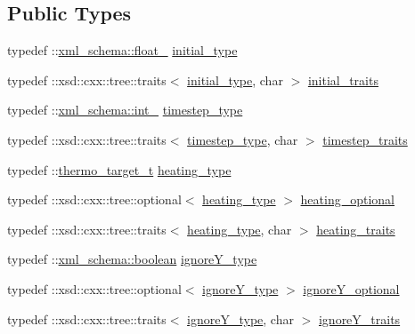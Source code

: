 \subsection*{Public Types}
\begin{DoxyCompactItemize}
\item 
typedef \+::\hyperlink{namespacexml__schema_ad7e04ab17bba0b3fdde43fb79ef6ed87}{xml\+\_\+schema\+::float\+\_\+} \hyperlink{classthermo__t_a3b889c80ce97870a6967ebee963438ed}{initial\+\_\+type}
\item 
typedef \+::xsd\+::cxx\+::tree\+::traits$<$ \hyperlink{classthermo__t_a3b889c80ce97870a6967ebee963438ed}{initial\+\_\+type}, char $>$ \hyperlink{classthermo__t_a857c3d12cdb293a7ec3ea2e2ac52812c}{initial\+\_\+traits}
\item 
typedef \+::\hyperlink{namespacexml__schema_acfa24ac68e1a188e7f44c36f7a158bf4}{xml\+\_\+schema\+::int\+\_\+} \hyperlink{classthermo__t_a6895e9b201424e2fada14df933774b0c}{timestep\+\_\+type}
\item 
typedef \+::xsd\+::cxx\+::tree\+::traits$<$ \hyperlink{classthermo__t_a6895e9b201424e2fada14df933774b0c}{timestep\+\_\+type}, char $>$ \hyperlink{classthermo__t_a22923d5493f01433df1b956905308222}{timestep\+\_\+traits}
\item 
typedef \+::\hyperlink{classthermo__target__t}{thermo\+\_\+target\+\_\+t} \hyperlink{classthermo__t_a53d64092b110ebaf8c36a23a2c9c40ec}{heating\+\_\+type}
\item 
typedef \+::xsd\+::cxx\+::tree\+::optional$<$ \hyperlink{classthermo__t_a53d64092b110ebaf8c36a23a2c9c40ec}{heating\+\_\+type} $>$ \hyperlink{classthermo__t_a07769e3087269c95ee4fc162c6bf4341}{heating\+\_\+optional}
\item 
typedef \+::xsd\+::cxx\+::tree\+::traits$<$ \hyperlink{classthermo__t_a53d64092b110ebaf8c36a23a2c9c40ec}{heating\+\_\+type}, char $>$ \hyperlink{classthermo__t_adb14cdd53e4543425bb71da6fbb034d5}{heating\+\_\+traits}
\item 
typedef \+::\hyperlink{namespacexml__schema_ae5ada4ec9c54b51765c3e4c0e9631bba}{xml\+\_\+schema\+::boolean} \hyperlink{classthermo__t_a20faf1f752e18e7d9e8f2f7b943fbf01}{ignore\+Y\+\_\+type}
\item 
typedef \+::xsd\+::cxx\+::tree\+::optional$<$ \hyperlink{classthermo__t_a20faf1f752e18e7d9e8f2f7b943fbf01}{ignore\+Y\+\_\+type} $>$ \hyperlink{classthermo__t_a95e0efa769cf6e41e4851c821fde82a9}{ignore\+Y\+\_\+optional}
\item 
typedef \+::xsd\+::cxx\+::tree\+::traits$<$ \hyperlink{classthermo__t_a20faf1f752e18e7d9e8f2f7b943fbf01}{ignore\+Y\+\_\+type}, char $>$ \hyperlink{classthermo__t_a73de5c924d01c03f5d5dda8f571a2f9b}{ignore\+Y\+\_\+traits}
\end{DoxyCompactItemize}
